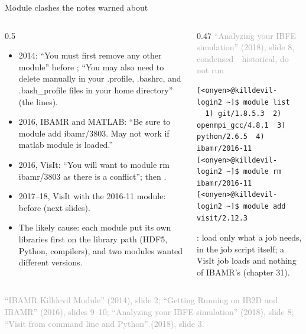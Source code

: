 \documentclass[aspectratio=169,11pt]{beamer}
\newcommand{\sourcecredit}[1]{\vfill\begin{flushright}\tiny\textcolor{DarkGray}{#1}\end{flushright}}
\newcommand{\hist}[1]{{\tiny\sffamily\textcolor{DarkGray}{#1\ \textbullet\ historical, do not run}}\par\nointerlineskip\vspace{0.3mm}}
\begin{document}
\begin{frame}[fragile]{Module clashes the notes warned about}
\label{fr:clashes}
\begin{columns}[T,onlytextwidth]
\begin{column}{0.5\textwidth}
\scriptsize
\begin{itemize}\setlength{\itemsep}{3pt}
  \item 2014: ``You must first remove any other module'' before ; ``You may also need to delete manually in your .profile, .bashrc, and .bash\_profile files in your home directory'' (the  lines).
  \item 2016, IBAMR and MATLAB: ``Be sure to module add ibamr/3803. May not work if matlab module is loaded.''
  \item 2016, VisIt: ``You will want to module rm ibamr/3803 as there is a conflict''; then .
  \item 2017--18, VisIt with the 2016-11 module:  before  (next slides).
  \item The likely cause: each module put its own libraries first on the library path (HDF5, Python, compilers), and two modules wanted different versions.
\end{itemize}
\end{column}
\begin{column}{0.47\textwidth}
\hist{``Analyzing your IBFE simulation'' (2018), slide 8, condensed}
\begin{lstlisting}[style=hist]
[<onyen>@killdevil-login2 ~]$ module list
  1) git/1.8.5.3  2) openmpi_gcc/4.8.1  3) python/2.6.5  4) ibamr/2016-11
[<onyen>@killdevil-login2 ~]$ module rm ibamr/2016-11
[<onyen>@killdevil-login2 ~]$ module add visit/2.12.3
\end{lstlisting}
\footnotesize {}: load only what a job needs, in the job script itself; a VisIt job loads  and nothing of IBAMR's (chapter 31).
\end{column}
\end{columns}
\sourcecredit{``IBAMR Killdevil Module'' (2014), slide 2; ``Getting Running on IB2D and IBAMR'' (2016), slides 9--10; ``Analyzing your IBFE simulation'' (2018), slide 8; ``Visit from command line and Python'' (2018), slide 3.}
\end{frame}
\end{document}
